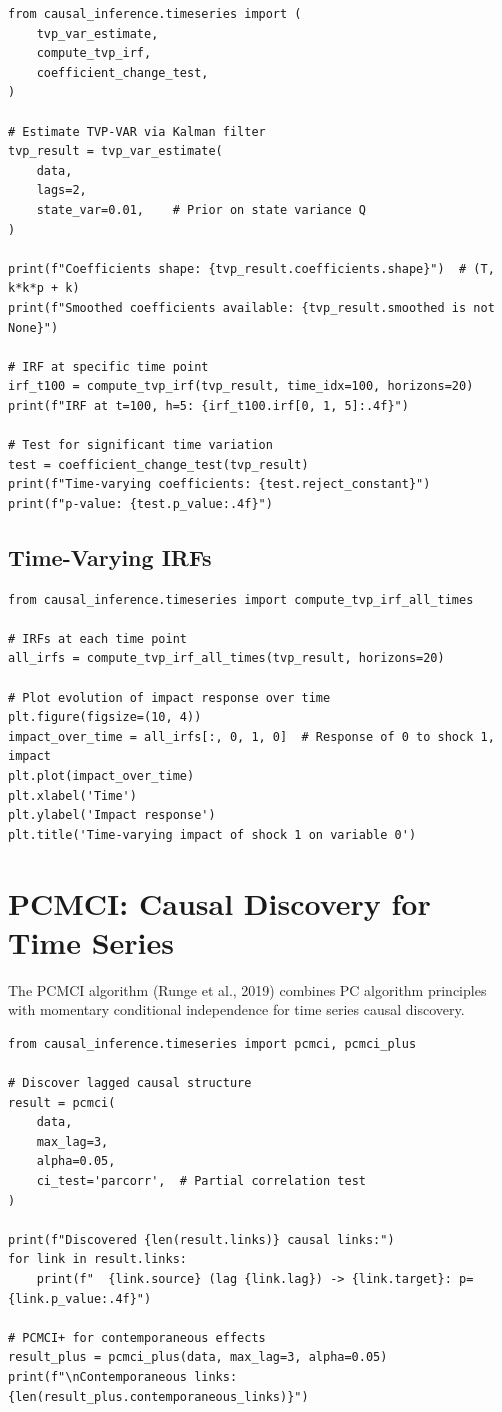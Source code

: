 \begin{verbatim}
from causal_inference.timeseries import (
    tvp_var_estimate,
    compute_tvp_irf,
    coefficient_change_test,
)

# Estimate TVP-VAR via Kalman filter
tvp_result = tvp_var_estimate(
    data,
    lags=2,
    state_var=0.01,    # Prior on state variance Q
)

print(f"Coefficients shape: {tvp_result.coefficients.shape}")  # (T, k*k*p + k)
print(f"Smoothed coefficients available: {tvp_result.smoothed is not None}")

# IRF at specific time point
irf_t100 = compute_tvp_irf(tvp_result, time_idx=100, horizons=20)
print(f"IRF at t=100, h=5: {irf_t100.irf[0, 1, 5]:.4f}")

# Test for significant time variation
test = coefficient_change_test(tvp_result)
print(f"Time-varying coefficients: {test.reject_constant}")
print(f"p-value: {test.p_value:.4f}")
\end{verbatim}

\subsection{Time-Varying IRFs}

\begin{verbatim}
from causal_inference.timeseries import compute_tvp_irf_all_times

# IRFs at each time point
all_irfs = compute_tvp_irf_all_times(tvp_result, horizons=20)

# Plot evolution of impact response over time
plt.figure(figsize=(10, 4))
impact_over_time = all_irfs[:, 0, 1, 0]  # Response of 0 to shock 1, impact
plt.plot(impact_over_time)
plt.xlabel('Time')
plt.ylabel('Impact response')
plt.title('Time-varying impact of shock 1 on variable 0')
\end{verbatim}


\section{PCMCI: Causal Discovery for Time Series}

The PCMCI algorithm (Runge et al., 2019) combines PC algorithm principles with momentary conditional independence for time series causal discovery.

\begin{verbatim}
from causal_inference.timeseries import pcmci, pcmci_plus

# Discover lagged causal structure
result = pcmci(
    data,
    max_lag=3,
    alpha=0.05,
    ci_test='parcorr',  # Partial correlation test
)

print(f"Discovered {len(result.links)} causal links:")
for link in result.links:
    print(f"  {link.source} (lag {link.lag}) -> {link.target}: p={link.p_value:.4f}")

# PCMCI+ for contemporaneous effects
result_plus = pcmci_plus(data, max_lag=3, alpha=0.05)
print(f"\nContemporaneous links: {len(result_plus.contemporaneous_links)}")
\end{verbatim}


